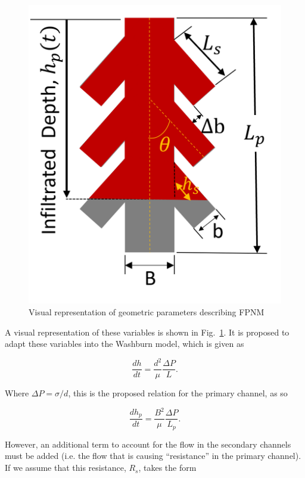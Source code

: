\documentclass{UCF_ETD}
\begin{document}
\begin{figure}
    \centering
    \includegraphics[width=\linewidth]{Figures/FPNM_cartoon.png}
    \caption{Visual representation of geometric parameters describing FPNM}
    \label{fig:FPNM_cartoon}
\end{figure}

\noindent A visual representation of these variables is shown in Fig.~\ref{fig:FPNM_cartoon}. It is proposed to adapt these variables into the Washburn model\cite{Washburn19213}, which is given as

\begin{equation}
    \frac{dh}{dt} = \frac{d^{2}}{\mu}\frac{\Delta P}{L}.
\end{equation}

\noindent Where $\Delta P = \sigma/d$, this is the proposed relation for the primary channel, as so

\begin{equation}
    \frac{dh_{p}}{dt} = \frac{B^{2}}{\mu}\frac{\Delta P}{L_{p}}.
\end{equation}

\noindent However, an additional term to account for the flow in the secondary channels must be added (i.e. the flow that is causing ``resistance'' in the primary channel). If we assume that this resistance, $R_{s}$, takes the form
\end{document}

